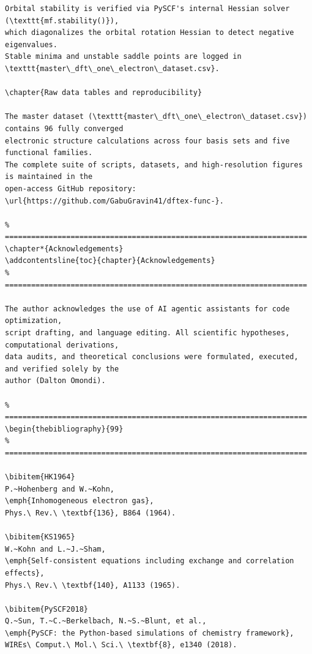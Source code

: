 \documentclass[11pt]{report}
\theoremstyle{definition}
\theoremstyle{remark}
\begin{document}
\begin{verbatim}
Orbital stability is verified via PySCF's internal Hessian solver (\texttt{mf.stability()}),
which diagonalizes the orbital rotation Hessian to detect negative eigenvalues.
Stable minima and unstable saddle points are logged in \texttt{master\_dft\_one\_electron\_dataset.csv}.

\chapter{Raw data tables and reproducibility}

The master dataset (\texttt{master\_dft\_one\_electron\_dataset.csv}) contains 96 fully converged
electronic structure calculations across four basis sets and five functional families.
The complete suite of scripts, datasets, and high-resolution figures is maintained in the
open-access GitHub repository: \url{https://github.com/GabuGravin41/dftex-func-}.

% =====================================================================
\chapter*{Acknowledgements}
\addcontentsline{toc}{chapter}{Acknowledgements}
% =====================================================================

The author acknowledges the use of AI agentic assistants for code optimization,
script drafting, and language editing. All scientific hypotheses, computational derivations,
data audits, and theoretical conclusions were formulated, executed, and verified solely by the
author (Dalton Omondi).

% =====================================================================
\begin{thebibliography}{99}
% =====================================================================

\bibitem{HK1964}
P.~Hohenberg and W.~Kohn,
\emph{Inhomogeneous electron gas},
Phys.\ Rev.\ \textbf{136}, B864 (1964).

\bibitem{KS1965}
W.~Kohn and L.~J.~Sham,
\emph{Self-consistent equations including exchange and correlation effects},
Phys.\ Rev.\ \textbf{140}, A1133 (1965).

\bibitem{PySCF2018}
Q.~Sun, T.~C.~Berkelbach, N.~S.~Blunt, et al.,
\emph{PySCF: the Python-based simulations of chemistry framework},
WIREs\ Comput.\ Mol.\ Sci.\ \textbf{8}, e1340 (2018).


\end{verbatim}
\end{document}
